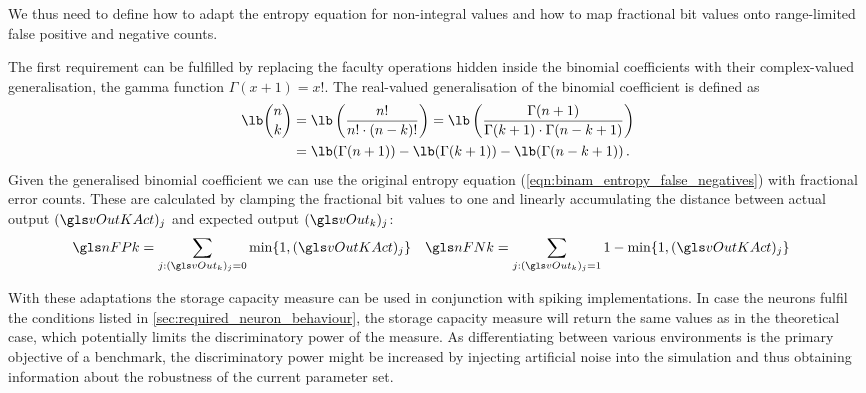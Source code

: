 We thus need to define how to adapt the entropy equation for non-integral values and how to map fractional bit values onto range-limited false positive and negative counts.

The first requirement can be fulfilled by replacing the faculty operations hidden inside the binomial coefficients with their complex-valued generalisation, the gamma function $\Gamma(x + 1) = x!$. The real-valued generalisation of the binomial coefficient is defined as
\begin{align}
	\lb\binom{n}{k}
		&= \lb\left(\frac{n!}{n! \cdot (n - k)!}\right)
		 = \lb\left(\frac{\Gamma(n + 1)}{\Gamma(k + 1) \cdot \Gamma(n - k + 1)}\right) \notag\\
		&= \lb(\Gamma(n + 1)) - \lb(\Gamma(k + 1)) - \lb(\Gamma(n - k + 1)) \,.
\end{align}
Given the generalised binomial coefficient we can use the original entropy equation (\ref{eqn:binam_entropy_false_negatives}) with fractional error counts. These are calculated by clamping the fractional bit values to one and linearly accumulating the distance between actual output \((\vOutKAct)_j\) and expected output \((\vOut_k)_j\):
\begin{align}
	\nFPk &= \sum_{j : (\vOut_k)_j = 0} \min \{1, (\vOutKAct)_j \}&
	\nFNk &= \sum_{j : (\vOut_k)_j = 1} 1 - \min \{1, (\vOutKAct)_j \}
\end{align}

With these adaptations the storage capacity measure can be used in conjunction with spiking \BiNAM implementations. In case the neurons fulfil the conditions listed in \cref{sec:required_neuron_behaviour}, the storage capacity measure will return the same values as in the theoretical case, which potentially limits the discriminatory power of the measure. As differentiating between various environments is the primary objective of a benchmark, the discriminatory power might be increased by injecting artificial noise into the simulation and thus obtaining information about the robustness of the current parameter set.

